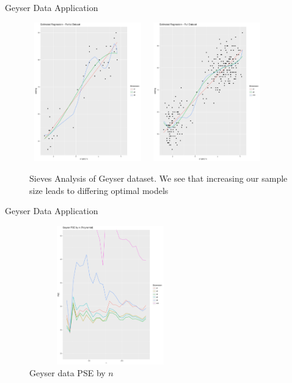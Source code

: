 \documentclass{beamer}
\begin{document}
\begin{frame}{Geyser Data Application}%
\begin{figure}[h]
    \centering
    \includegraphics[width=0.45\textwidth, height = 6cm]{Geyser_Small_Data.pdf}
    \includegraphics[width=0.45\textwidth, height = 6cm]{Geyser_Full.pdf}
    \caption{Sieves Analysis of Geyser dataset. We see that increasing our sample size leads to differing optimal models}
    \label{fig:Geyser}{}
\end{figure}
\end{frame}
\begin{frame}{Geyser Data Application}%
\begin{figure}[h]
\centering
\includegraphics[width = 7cm, height = 6cm]{Geyser_PSE.pdf}
    \caption{Geyser data PSE by $n$}
    \label{fig:Geyser}{}
\end{figure}
\end{frame}
\end{document}
